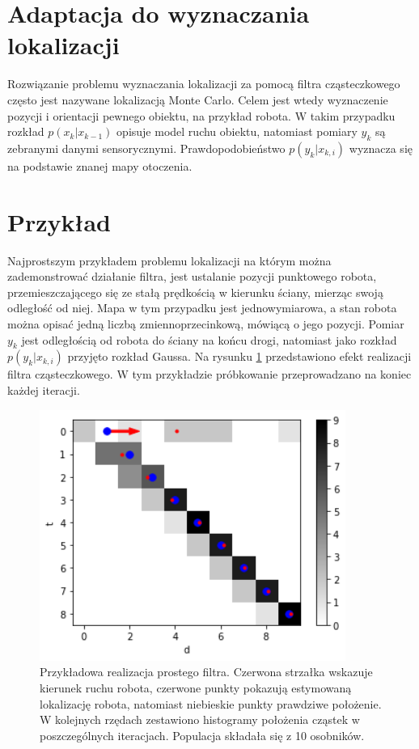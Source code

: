 \section{Adaptacja do wyznaczania lokalizacji}
Rozwiązanie problemu wyznaczania lokalizacji za pomocą filtra cząsteczkowego często jest nazywane lokalizacją Monte Carlo. Celem jest wtedy wyznaczenie pozycji i orientacji pewnego obiektu, na przykład robota. W takim przypadku rozkład $p(x_k|x_{k-1})$ opisuje model ruchu obiektu, natomiast pomiary $y_k$ są zebranymi danymi sensorycznymi. Prawdopodobieństwo $p(y_k|x_{k,i})$ wyznacza się na podstawie znanej mapy otoczenia.

\section{Przykład}\label{simple_example_chap}
Najprostszym przykładem problemu lokalizacji na którym można zademonstrować działanie filtra, jest ustalanie pozycji punktowego robota, przemieszczającego się ze stałą prędkością w kierunku ściany, mierząc swoją odległość od niej. Mapa w tym przypadku jest jednowymiarowa, a stan robota można opisać jedną liczbą zmiennoprzecinkową, mówiącą o jego pozycji. Pomiar $y_k$ jest odległością od robota do ściany na końcu drogi, natomiast jako rozkład $p(y_k|x_{k,i})$ przyjęto rozkład Gaussa. Na rysunku \ref{simple_example} przedstawiono efekt realizacji filtra cząsteczkowego. W tym przykładzie próbkowanie przeprowadzano na koniec każdej iteracji.

\begin{figure}[H]
	\begin{center}
		\includegraphics[width=10cm]{./simple_example.png}
		\caption{Przykładowa realizacja prostego filtra. Czerwona strzałka wskazuje kierunek ruchu robota, czerwone punkty pokazują estymowaną lokalizację robota, natomiast niebieskie punkty prawdziwe położenie. W kolejnych rzędach zestawiono histogramy położenia cząstek w poszczególnych iteracjach. Populacja składała się z 10 osobników.}\label{simple_example}
	\end{center}
\end{figure}


